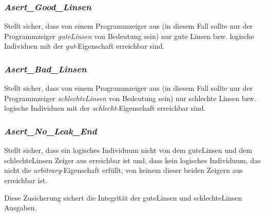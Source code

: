 
\subsubsection{\emph{Asert\_Good\_Linsen}}
Stellt sicher, dass von einem Programmzeiger aus (in diesem Fall sollte nur der Programmzeiger \emph{guteLinsen} von Bedeutung sein) nur gute Linsen bzw. logische Individuen mit der \emph{gut}-Eigenschaft erreichbar sind.


\subsubsection{\emph{Asert\_Bad\_Linsen}}
Stellt sicher, dass von einem Programmzeiger aus (in diesem Fall sollte nur der Programmzeiger \emph{schlechteLinsen} von Bedeutung sein) nur schlechte Linsen bzw. logische Individuen mit der \emph{schlecht}-Eigenschaft erreichbar sind.


\subsubsection{\emph{Asert\_No\_Leak\_End}}
Stellt sicher, dass ein logisches Individuum nicht von dem guteLinsen und dem schlechteLinsen Zeiger aus erreichbar ist und, dass kein logisches Individuum, das nicht die \emph{arbitrary}-Eigenschaft erfüllt, von keinem dieser beiden Zeigern aus erreichbar ist.

Diese Zusicherung sichert die Integrität der guteLinsen und schlechteLinsen Ausgaben.

